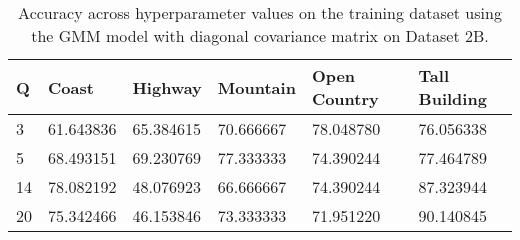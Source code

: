 \begin{table}[H]
\centering
\begin{tabular}{l l l l l l}
\hline
\hline
\textbf{Q} & \textbf{Coast} & \textbf{Highway} & \textbf{Mountain} & \textbf{Open Country} & \textbf{Tall Building} \\
\hline
\hline
3 & 61.643836 & 65.384615 & 70.666667 & 78.048780 & 76.056338 \\
5 & 68.493151 & 69.230769 & 77.333333 & 74.390244 & 77.464789 \\
14 & 78.082192 & 48.076923 & 66.666667 & 74.390244 & 87.323944 \\
20 & 75.342466 & 46.153846 & 73.333333 & 71.951220 & 90.140845 \\
\hline
\end{tabular}
\caption{Accuracy across hyperparameter values on the training dataset using the GMM model with diagonal covariance matrix on Dataset 2B.}
\label{tab:2B_diag_dev}
\end{table}
